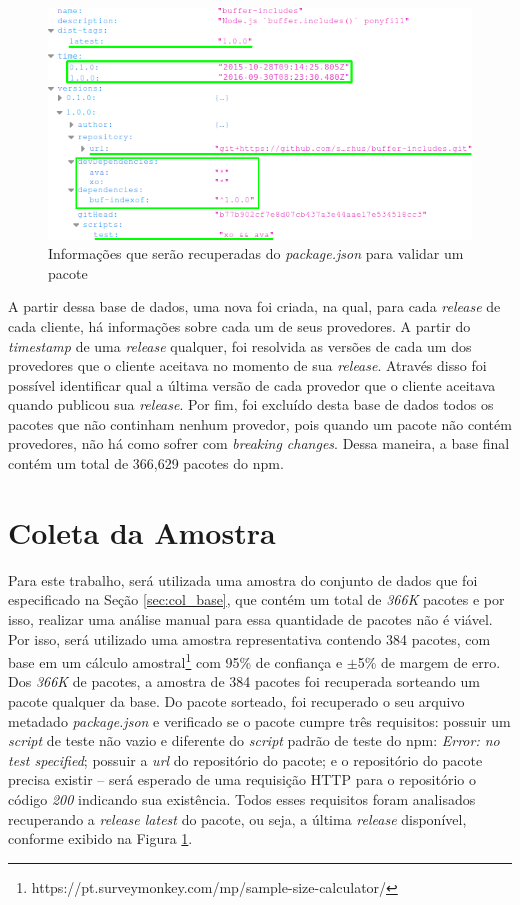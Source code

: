 \begin{figure}
    \centering
    \includegraphics[scale=0.5]{figuras/package_json.png}
    \caption{Informações que serão recuperadas do \textit{package.json} para validar um pacote}
    \label{fig:package_json}
\end{figure}{}

A partir dessa base de dados, uma nova foi criada, na qual, para cada \textit{release} de cada cliente, há informações sobre cada um de seus provedores. A partir do \textit{timestamp} de uma \textit{release} qualquer, foi resolvida as versões de cada um dos provedores que o cliente aceitava no momento de sua \textit{release}. Através disso foi possível identificar qual a última versão de cada provedor que o cliente aceitava quando publicou sua \textit{release}. Por fim, foi excluído desta base de dados todos os pacotes que não continham nenhum provedor, pois quando um pacote não contém provedores, não há como sofrer com \textit{breaking changes}. Dessa maneira, a base final contém um total de 366,629 pacotes do \gls{npm}.

\section{Coleta da Amostra}
\label{sec:col_amostra}
Para este trabalho, será utilizada uma amostra do conjunto de dados que foi especificado na Seção \ref{sec:col_base}, que contém um total de \textit{366K} pacotes e por isso, realizar uma análise manual para essa quantidade de pacotes não é viável. Por isso, será utilizado uma amostra representativa contendo 384 pacotes, com base em um cálculo amostral\footnote{https://pt.surveymonkey.com/mp/sample-size-calculator/} com 95\% de confiança e $\pm$5\% de margem de erro. Dos \textit{366K} de pacotes, a amostra de 384 pacotes foi recuperada sorteando um pacote qualquer da base. Do pacote sorteado, foi recuperado o seu arquivo metadado \textit{package.json} e verificado se o pacote cumpre três requisitos: possuir um \textit{script} de teste não vazio e diferente do \textit{script} padrão de teste do \gls{npm}: \textit{Error: no test specified}; possuir a \textit{url} do repositório do pacote; e o repositório do pacote precisa existir -- será esperado de uma requisição \Gls{HTTP} para o repositório o código \textit{200} indicando sua existência. Todos esses requisitos foram analisados recuperando a \textit{release latest} do pacote, ou seja, a última \textit{release} disponível, conforme exibido na Figura \ref{fig:package_json}.

